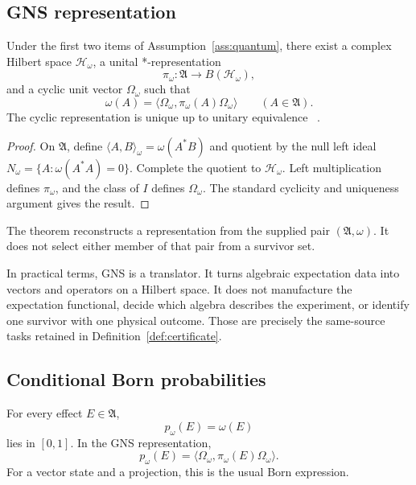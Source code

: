 \documentclass[11pt]{article}
\newcommand{\Hilb}{\mathcal H}
\newcommand{\Alg}{\mathfrak A}
\begin{document}
\subsection{GNS representation}

\begin{theorem}\label{thm:gns}
Under the first two items of Assumption~\ref{ass:quantum}, there exist a complex
Hilbert space $\Hilb_\omega$, a unital *-representation
\[
 \pi_\omega:\Alg\longrightarrow B(\Hilb_\omega),
\]
and a cyclic unit vector $\Omega_\omega$ such that
\[
 \omega(A)
 =\langle\Omega_\omega,\pi_\omega(A)\Omega_\omega\rangle
 \qquad(A\in\Alg).
\]
The cyclic representation is unique up to unitary equivalence
~\cite{Murphy,BratteliRobinson}.
\end{theorem}

\begin{proof}
On $\Alg$, define
$\langle A,B\rangle_\omega=\omega(A^*B)$ and quotient by the null left ideal
$N_\omega=\{A:\omega(A^*A)=0\}$.  Complete the quotient to
$\Hilb_\omega$.  Left multiplication defines $\pi_\omega$, and the class of
$I$ defines $\Omega_\omega$.  The standard cyclicity and uniqueness argument
gives the result.
\end{proof}

\begin{remark}
The theorem reconstructs a representation from the supplied pair
$(\Alg,\omega)$.  It does not select either member of that pair from a
survivor set.
\end{remark}

In practical terms, GNS is a translator.  It turns algebraic expectation data
into vectors and operators on a Hilbert space.  It does not manufacture the
expectation functional, decide which algebra describes the experiment, or
identify one survivor with one physical outcome.  Those are precisely the
same-source tasks retained in Definition~\ref{def:certificate}.

\subsection{Conditional Born probabilities}

\begin{proposition}
\label{prop:born}
For every effect $E\in\Alg$,
\[
 p_\omega(E)=\omega(E)
\]
lies in $[0,1]$.  In the GNS representation,
\[
 p_\omega(E)
 =\langle\Omega_\omega,\pi_\omega(E)\Omega_\omega\rangle.
\]
For a vector state and a projection, this is the usual Born expression.
\end{proposition}
\end{document}
